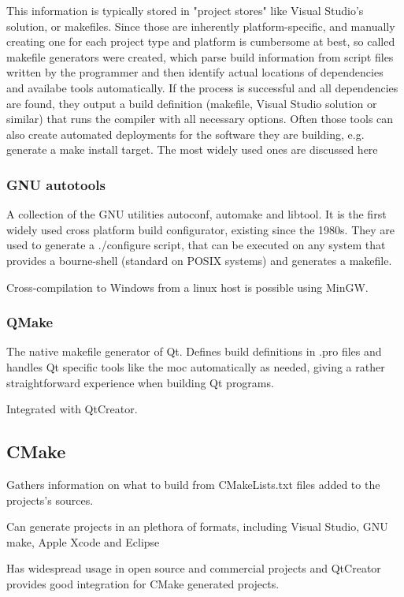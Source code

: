 This information is typically stored in "project stores" like Visual Studio's solution, or makefiles. Since those are inherently platform-specific, and manually creating one for each project type and platform is cumbersome at best, so called makefile generators were created, which parse build information from script files written by the programmer and then identify actual locations of dependencies and availabe tools automatically. If the process is successful and all dependencies are found, they output a build definition (makefile, Visual Studio solution or similar) that runs the compiler with all necessary options. Often those tools can also create automated deployments for the software they are building, e.g. generate a make install target. The most widely used ones are discussed here

\subsubsection{GNU autotools}
A collection of the GNU utilities autoconf, automake and libtool. It is the first widely used cross platform build configurator, existing since the 1980s. They are used to generate a ./configure script, that can be executed on any system that provides a bourne-shell (standard on POSIX systems) and generates a makefile.

Cross-compilation to Windows from a linux host is possible using MinGW. 

\subsubsection{QMake}
The native makefile generator of Qt. Defines build definitions in .pro files and handles Qt specific tools like the \gls{moc} automatically as needed, giving a rather straightforward experience when building Qt programs.

Integrated with QtCreator.

\subsection{CMake}
Gathers information on what to build from CMakeLists.txt files added to the projects's sources.

Can generate projects in an plethora of formats, including Visual Studio, GNU make,  Apple Xcode and Eclipse

Has widespread usage in open source and commercial projects and QtCreator provides good integration for CMake generated projects.
